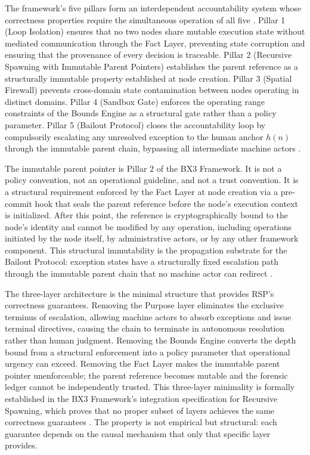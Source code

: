 \documentclass[11pt,oneside]{article}
\begin{document}
The framework's five pillars form an interdependent accountability system whose correctness properties require the simultaneous operation of all five \cite{bx3framework}. Pillar 1 (Loop Isolation) ensures that no two nodes share mutable execution state without mediated communication through the Fact Layer, preventing state corruption and ensuring that the provenance of every decision is traceable. Pillar 2 (Recursive Spawning with Immutable Parent Pointers) establishes the parent reference as a structurally immutable property established at node creation. Pillar 3 (Spatial Firewall) prevents cross-domain state contamination between nodes operating in distinct domains. Pillar 4 (Sandbox Gate) enforces the operating range constraints of the Bounds Engine as a structural gate rather than a policy parameter. Pillar 5 (Bailout Protocol) closes the accountability loop by compulsorily escalating any unresolved exception to the human anchor $h(n)$ through the immutable parent chain, bypassing all intermediate machine actors \cite{bx3framework,bailoutprotocol2026}.

The immutable parent pointer is Pillar 2 of the BX3 Framework. It is not a policy convention, not an operational guideline, and not a trust convention. It is a structural requirement enforced by the Fact Layer at node creation via a pre-commit hook that seals the parent reference before the node's execution context is initialized. After this point, the reference is cryptographically bound to the node's identity and cannot be modified by any operation, including operations initiated by the node itself, by administrative actors, or by any other framework component. This structural immutability is the propagation substrate for the Bailout Protocol: exception states have a structurally fixed escalation path through the immutable parent chain that no machine actor can redirect \cite{bailoutprotocol2026}.

The three-layer architecture is the minimal structure that provides RSP's correctness guarantees. Removing the Purpose layer eliminates the exclusive terminus of escalation, allowing machine actors to absorb exceptions and issue terminal directives, causing the chain to terminate in autonomous resolution rather than human judgment. Removing the Bounds Engine converts the depth bound from a structural enforcement into a policy parameter that operational urgency can exceed. Removing the Fact Layer makes the immutable parent pointer unenforceable; the parent reference becomes mutable and the forensic ledger cannot be independently trusted. This three-layer minimality is formally established in the BX3 Framework's integration specification for Recursive Spawning, which proves that no proper subset of layers achieves the same correctness guarantees \cite{bx3framework,bailoutprotocol2026}. The property is not empirical but structural: each guarantee depends on the causal mechanism that only that specific layer provides.
\end{document}
